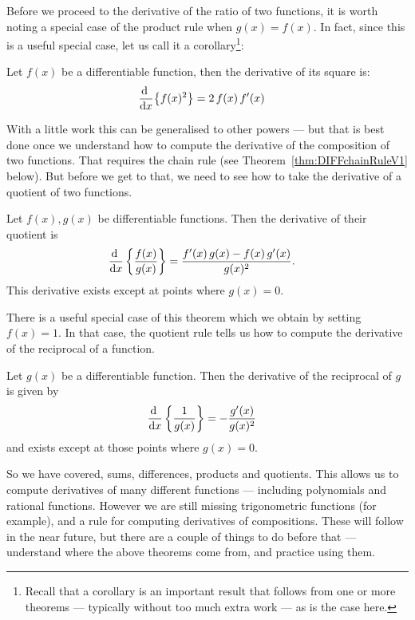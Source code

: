 Before we proceed to the derivative of the ratio of two functions, it is worth noting a
special case of the product rule when $g(x)=f(x)$. In fact, since this is a useful
special case, let us call it a corollary\footnote{Recall that a corollary is an important
result that follows from one or more theorems --- typically without too much extra work
--- as is the case here.}:
\begin{cor}
Let $f(x)$ be a differentiable function, then the derivative of its square is:
\begin{align*}
  \diff{}{x} \big\{ f(x)^2 \big\} &=  2\, f(x)\, f'(x)
\end{align*}
\end{cor}
With a little work this can be generalised to other powers --- but that is best done once
we understand how to compute the derivative of the composition of two functions. That
requires the chain rule (see Theorem~\ref{thm:DIFFchainRuleV1} below). But before we get
to that, we need to see how to take the derivative of a quotient of two functions.

\begin{theorem}\label{thm:DIFFquotRule}
Let $f(x), g(x)$ be differentiable functions. Then the derivative of their quotient
is
\begin{align*}
  \diff{}{x} \left\{ \frac{f(x)}{g(x)} \right\} &=
\frac{f'(x) \, g(x) - f(x) \, g'(x)}{g(x)^2}.
\end{align*}
This derivative exists except at points where $g(x)=0$.
\end{theorem}
There is a useful special case of this theorem which we obtain by setting $f(x)=1$. In
that case, the quotient rule tells us how to compute the derivative of the reciprocal of
a function.
\begin{cor}\label{cor diff recip}
Let $g(x)$ be a differentiable function. Then the derivative of the reciprocal of $g$ is
given by
\begin{align*}
  \diff{}{x} \left\{ \frac{1}{g(x)} \right\} &= -\frac{g'(x)}{g(x)^2}
\end{align*}
and exists except at those points where $g(x)=0$.
\end{cor}


So we have covered, sums, differences, products and quotients. This allows us
to compute derivatives of many different functions --- including polynomials
and rational functions. However we are still missing trigonometric functions
(for example), and a rule for computing derivatives of compositions. These will
follow in the near future, but there are a couple of things to do before that
--- understand where the above theorems come from, and practice using them.


